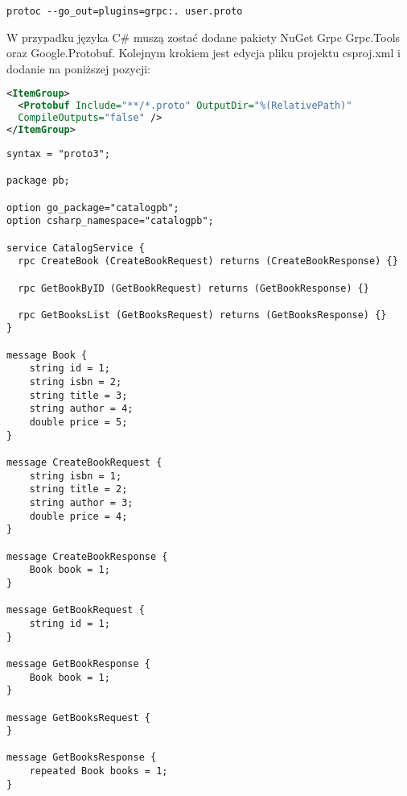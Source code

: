 \begin{center}
    \begin{lstlisting}[caption=Polecenie do generowania kodu z plików proto dla języka Go]
        protoc --go_out=plugins=grpc:. user.proto
    \end{lstlisting}
\end{center}
W przypadku języka C\# muszą zostać dodane pakiety NuGet Grpc Grpc.Tools oraz Google.Protobuf. Kolejnym krokiem jest edycja pliku projektu csproj.xml i dodanie na poniższej pozycji:
\begin{lstlisting}[language=xml, caption=Modyfikacjie pliku projektu net core]
<ItemGroup>
  <Protobuf Include="**/*.proto" OutputDir="%(RelativePath)" 
  CompileOutputs="false" />
</ItemGroup>
\end{lstlisting}
\begin{lstlisting}[language=IDL, caption=Definicje usług i komunikatów dla usługi katalogu książek]
syntax = "proto3";

package pb;

option go_package="catalogpb";
option csharp_namespace="catalogpb";

service CatalogService {    
  rpc CreateBook (CreateBookRequest) returns (CreateBookResponse) {}
   
  rpc GetBookByID (GetBookRequest) returns (GetBookResponse) {}
  
  rpc GetBooksList (GetBooksRequest) returns (GetBooksResponse) {}
}

message Book {
    string id = 1;
    string isbn = 2;
    string title = 3;
    string author = 4;
    double price = 5;
}

message CreateBookRequest {
    string isbn = 1;
    string title = 2;
    string author = 3;
    double price = 4;
}

message CreateBookResponse {
    Book book = 1;
}

message GetBookRequest {
    string id = 1;
}

message GetBookResponse {
    Book book = 1;
}

message GetBooksRequest {
}

message GetBooksResponse {
    repeated Book books = 1;
}
\end{lstlisting}
